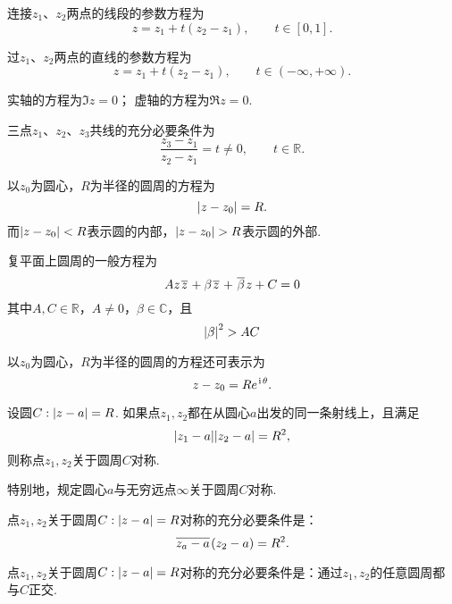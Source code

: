 \begin{example}[线段]
连接\(z_1\)、\(z_2\)两点的线段的参数方程为\[
z = z_1 + t(z_2 - z_1), \qquad t \in [0,1].
\]
\end{example}

\begin{example}[直线]
过\(z_1\)、\(z_2\)两点的直线的参数方程为\[
z = z_1 + t(z_2 - z_1), \qquad t \in (-\infty,+\infty).
\]

实轴的方程为\(\Im z = 0\)；
虚轴的方程为\(\Re z = 0\).
\end{example}

\begin{example}[三点共线的充分必要条件]
三点\(z_1\)、\(z_2\)、\(z_3\)共线的充分必要条件为\[
\frac{z_3 - z_1}{z_2 - z_1} = t \neq 0, \qquad t \in \mathbb{R}.
\]
\end{example}

\begin{example}[圆]
以\(z_0\)为圆心，\(R\)为半径的圆周的方程为\[
\abs{z - z_0} = R.
\]而\(\abs{z-z_0}<R\)表示圆的内部，\(\abs{z-z_0}>R\)表示圆的外部.

复平面上圆周的一般方程为\[
A z \kern1pt\overline{z}\kern1pt + \beta \kern1pt\overline{z}\kern1pt + \kern1pt\overline{\beta}\kern1pt z + C = 0
\]其中\(A,C\in\mathbb{R}\)，\(A \neq 0\)，\(\beta\in\mathbb{C}\)，且\[
\abs{\beta}^2 > AC
\]

以\(z_0\)为圆心，\(R\)为半径的圆周的方程还可表示为\[
z - z_0 = R e^{\kern1pt\mathrm{i}\kern1pt \theta}.
\]
\end{example}

\begin{definition}
设圆\(C: \abs{z - a} = R\).
如果点\(z_1,z_2\)都在从圆心\(a\)出发的同一条射线上，且满足\[
\abs{z_1 - a} \abs{z_2 - a} = R^2,
\]则称点\(z_1,z_2\)关于圆周\(C\)对称.

特别地，规定圆心\(a\)与无穷远点\(\infty\)关于圆周\(C\)对称.
\end{definition}

\begin{theorem}
点\(z_1,z_2\)关于圆周\(C: \abs{z - a} = R\)对称的充分必要条件是：\[
\kern1pt\overline{z_a - a}\kern1pt (z_2 - a) = R^2.
\]
\end{theorem}

\begin{theorem}
点\(z_1,z_2\)关于圆周\(C: \abs{z - a} = R\)对称的充分必要条件是：通过\(z_1,z_2\)的任意圆周都与\(C\)正交.
\end{theorem}
